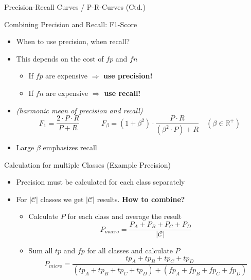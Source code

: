 \begin{frame}{Precision-Recall Curves / P-R-Curves (Ctd.)}{}
	
\end{frame}


\begin{frame}{Combining Precision and Recall: F1-Score}{}\important
	\begin{itemize}
		\item When to use precision, when recall?
		\item This depends on the cost of $fp$ and $fn$
		\begin{itemize}
			\item If $fp$ are expensive $\Rightarrow$ \textbf{use precision!}
			\item If $fn$ are expensive $\Rightarrow$ \textbf{use recall!}
		\end{itemize}
		\item {} \textit{(harmonic mean of precision and recall)}
		\begin{equation}
			F_1 = \frac{2 \cdot P \cdot R}{P + R} \qquad\quad
			F_{\beta} = (1 + \beta^2) \cdot \frac{P \cdot R}{(\beta^2 \cdot P) + R} \quad (\beta \in \mathbb{R}^+)
		\end{equation}
		\item Large $\beta$ emphasizes recall
	\end{itemize}
\end{frame}


\begin{frame}{Calculation for multiple Classes (Example Precision)}{}
	\begin{itemize}
		\item Precision must be calculated for each class separately
		\item For $\vert \mathcal{C} \vert$ classes we get $\vert \mathcal{C} \vert$ results. \textbf{How to combine?}
		\begin{itemize}
			\item {} Calculate $P$ for each class and average the result
			\begin{equation}
				P_{macro} = \frac{P_A + P_B + P_C + P_D}{\vert \mathcal{C} \vert}
			\end{equation}
			\item {} Sum all $tp$ and $fp$ for all classes and calculate $P$
			\begin{equation}
				P_{micro} = \frac{tp_A + tp_B + tp_C + tp_D}{(tp_A + tp_B + tp_C + tp_D) + (fp_A + fp_B + fp_C + fp_D)}
			\end{equation}
		\end{itemize}
	\end{itemize}
\end{frame}



